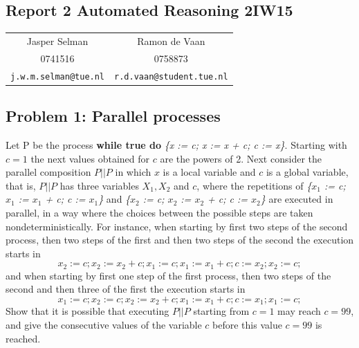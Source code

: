 \documentclass[12pt]{article}
\begin{document}
\begin{center}
\section*{Report 2 Automated Reasoning 2IW15 }
\end{center}
\begin{center}
\begin{tabular}{c c}
Jasper Selman & Ramon de Vaan\\
0741516 & 0758873\\
{\tt j.w.m.selman@tue.nl} & {\tt r.d.vaan@student.tue.nl}
\end{tabular}
\end{center}

\vspace{8mm}

\subsection*{Problem 1: Parallel processes}

Let P be the process \textbf{while true do} \textit{\{x := c; x := x + c; c := x\}}. Starting with $c = 1$ the next values obtained for $c$ are the powers of 2. Next consider the parallel composition $P||P$ in which $x$ is a local variable and $c$ is a global variable, that is, $P||P$ has three variables $X_1, X_2$ and $c$, where the repetitions of \textit{\{$x_1$ := c; $x_1$ := $x_1$ + c; c := $x_1$\}} and \textit{\{$x_2$ := c;  $x_2$ :=  $x_2$ + c; c := $x_2$\}} are executed in parallel, in a way where the choices between the possible steps are taken nondeterministically. For instance, when starting by first two steps of the second process, then two steps of the first and then two steps of the second the execution starts in
\[x_2 := c;  x_2 :=  x_2 + c; x_1 := c; x_1 := x_1 + c; c := x_2; x_2 := c;\]
and when starting  by first one step of the first process, then two steps of the second and then three of the first the execution starts in
\[x_1 := c; x_2 := c; x_2 :=  x_2 + c;  x_1 := x_1 + c; c := x_1; x_1 := c;\]
Show that it is possible that executing $P||P$ starting from $c = 1$ may reach $c = 99$, and give the consecutive values of the variable $c$ before this value $c = 99$ is reached.

\vspace{5mm}
\end{document}
